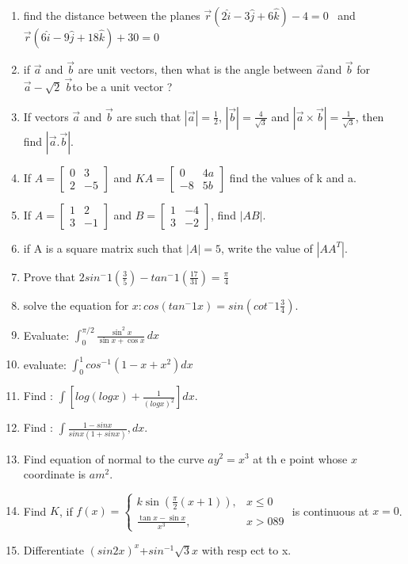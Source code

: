 \documentclass[12pt,-letter paper]{article}
\providecommand{\myvec}[1]{\ensuremath{\begin{bmatrix}#1\end{bmatrix}}}
\begin{document}
\begin{enumerate}
\item find the distance between the planes $\overrightarrow{r}(2\hat{i}-3\hat{j}+6\hat{k})-4= 0$  \ and  \     $\overrightarrow {r}(6\hat{i}-9\hat{j}+18\hat{k})+30=0$
\item if $\overrightarrow{a}$ and $\overrightarrow{b}$ are unit vectors, then what is the angle between $\overrightarrow{a}$and $\overrightarrow{b}$ for $\overrightarrow{a}-\sqrt{2} \ \overrightarrow{b}$to be a unit vector ?
\item If vectors $\overrightarrow{a}$ and $\overrightarrow{b}$ are such that $|\overrightarrow{a}|=\frac{1}{2}$, $|\overrightarrow{b}|=\frac{4}{\sqrt{3}}$ and $|\overrightarrow{a} \times \overrightarrow{b}|=\frac{1}{\sqrt{3}}$, then find $|\overrightarrow{a}.\overrightarrow{b}|$.
\item If $A=\myvec{0 & 3 \\ 2 & -5}$ and $KA=\myvec{0 & 4a \\ -
    8 & 5b }$ find the values of k and a.
\item If $A=\myvec{1 & 2 \\ 3 & -1}$ and  $B = \myvec {1 & -4 \\ 3 & -2 }    $, find $|AB|$.
\item if A is a square matrix such that $|A|=5$, write the value of $|AA^T|$.
\item Prove that $2sin^-1 (\frac{3}{5})-tan^-1(\frac{17}{31})=\frac{\pi}{4}$
\item solve the equation for $x:cos(tan^-1 x)=sin(cot^-1\frac{3}{4})$.
\item Evaluate: $\int_{0}^{\pi/2} \frac{\sin^2 x}{\sin x + \cos x} \,dx$
\item evaluate: $\int_{0}^{1} cos^{-1}(1-x+x^2)dx $
\item Find : $\int[log(logx)+\frac{1}{(logx)^2}]dx$.
\item Find : $\int\frac{1-sinx}{sinx(1+sinx)},dx$.
\item Find equation of normal to the curve $ay^2=x^3$ at th    e point whose $x$ coordinate is $am^2$. 
\item Find $K$, if $f(x) = \begin{cases}
 k \sin\left(\frac{\pi}{2}(x+1)\right), & x \leq 0 \\
  \frac{\tan x - \sin x}{x^3}, & x > 0                        89 \end{cases}$ is continuous at $x = 0$.
\item Differentiate $(sin2x)^x$+$sin^{-1}\sqrt3x$ with resp    ect to x.

\end{enumerate}
\end{document}
